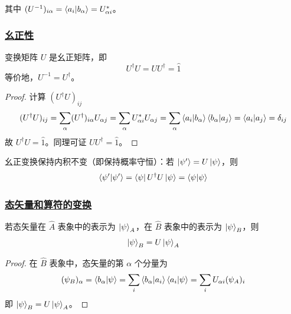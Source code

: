 其中 $(U^{-1})_{i\alpha} = \braket{a_i}{b_\alpha} = U_{\alpha i}^*$。

\subsubsection{\protect\hyperlink{:}{幺正性}}

\begin{theorem}[变换矩阵的幺正性]
    变换矩阵 $U$ 是幺正矩阵，即
    \begin{equation}
        U^\dagger U = UU^\dagger = \hat{1}
    \end{equation}
    等价地，$U^{-1} = U^\dagger$。
\end{theorem}

\begin{proof}
    计算 $(U^\dagger U)_{ij}$
    \begin{equation}
        (U^\dagger U)_{ij} = \sum_\alpha (U^\dagger)_{i\alpha}U_{\alpha j} = \sum_\alpha U_{\alpha i}^* U_{\alpha j} = \sum_\alpha \braket{a_i}{b_\alpha}\braket{b_\alpha}{a_j} = \braket{a_i}{a_j} = \delta_{ij}
    \end{equation}
    故 $U^\dagger U = \hat{1}$。同理可证 $UU^\dagger = \hat{1}$。
\end{proof}

\begin{remark}
    幺正变换保持内积不变（即保持概率守恒）：若 $\ket{\psi'} = U\ket{\psi}$，则
    \begin{equation}
        \braket{\psi'}{\psi'} = \bra{\psi}U^\dagger U\ket{\psi} = \braket{\psi}{\psi}
    \end{equation}
\end{remark}

\subsubsection{\protect\hyperlink{:}{态矢量和算符的变换}}

\begin{theorem}[态矢量的表象变换]
    若态矢量在 $\hat{A}$ 表象中的表示为 $\ket{\psi}_A$，在 $\hat{B}$ 表象中的表示为 $\ket{\psi}_B$，则
    \begin{equation}
        \ket{\psi}_B = U\ket{\psi}_A
    \end{equation}
\end{theorem}

\begin{proof}
    在 $\hat{B}$ 表象中，态矢量的第 $\alpha$ 个分量为
    \begin{equation}
        (\psi_B)_\alpha = \braket{b_\alpha}{\psi} = \sum_i \braket{b_\alpha}{a_i}\braket{a_i}{\psi} = \sum_i U_{\alpha i}(\psi_A)_i
    \end{equation}
    即 $\ket{\psi}_B = U\ket{\psi}_A$。
\end{proof}

